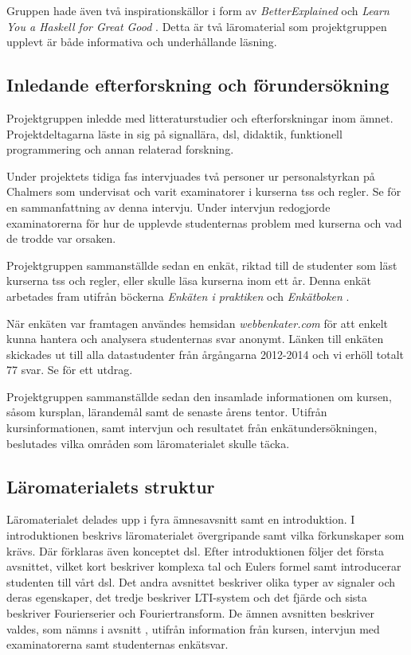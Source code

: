 \documentclass[12pt,a4paper,twoside,openright]{article}
\begin{document}
Gruppen hade även två inspirationskällor i form av
\textit{BetterExplained} \cite{betterexplained} och \textit{Learn You
  a Haskell for Great Good} \cite{learnyouahaskell}. Detta är två
läromaterial som projektgruppen upplevt är både informativa och
underhållande läsning.

\subsection{Inledande efterforskning och förundersökning}
\label{sec:efterforskning}

Projektgruppen inledde med litteraturstudier och efterforskningar inom
ämnet. Projektdeltagarna läste in sig på signallära, \gls{dsl},
didaktik, funktionell programmering och annan relaterad forskning.

Under projektets tidiga fas intervjuades två personer ur
personalstyrkan på Chalmers som undervisat och varit examinatorer i
kurserna \gls{tss} och \gls{regler}. Se
 för en sammanfattning av denna
intervju. Under intervjun redogjorde examinatorerna för hur de
upplevde studenternas problem med kurserna och vad de trodde var
orsaken.

Projektgruppen sammanställde sedan en enkät, riktad till de studenter
som läst kurserna \gls{tss} och \gls{regler}, eller skulle läsa
kurserna inom ett år. Denna enkät arbetades fram utifrån böckerna
\textit{Enkäten i praktiken} \cite{enkaten_i_praktiken} och
\textit{Enkätboken} \cite{enkatboken}.

När enkäten var framtagen användes hemsidan \textit{webbenkater.com}
för att enkelt kunna hantera och analysera studenternas svar anonymt.
Länken till enkäten skickades ut till alla datastudenter från
årgångarna 2012-2014 och vi erhöll totalt 77 svar. Se
 för ett utdrag.

Projektgruppen sammanställde sedan den insamlade informationen om
kursen, såsom kursplan, lärandemål samt de senaste årens
tentor. Utifrån kursinformationen, samt intervjun och resultatet från
enkätundersökningen, beslutades vilka områden som läromaterialet
skulle täcka.

\subsection{Läromaterialets struktur}
\label{sec:struktur}
Läromaterialet delades upp i fyra ämnesavsnitt samt en introduktion. I
introduktionen beskrivs läromaterialet övergripande samt vilka
förkunskaper som krävs. Där förklaras även konceptet \gls{dsl}. Efter
introduktionen följer det första avsnittet, vilket kort beskriver
komplexa tal och Eulers formel samt introducerar studenten till vårt
\gls{dsl}. Det andra avsnittet beskriver olika typer av signaler och
deras egenskaper, det tredje beskriver LTI-system och det fjärde och
sista beskriver Fourierserier och Fouriertransform. De ämnen avsnitten
beskriver valdes, som nämns i avsnitt ,
utifrån information från kursen, intervjun med examinatorerna samt
studenternas enkätsvar.
\end{document}
